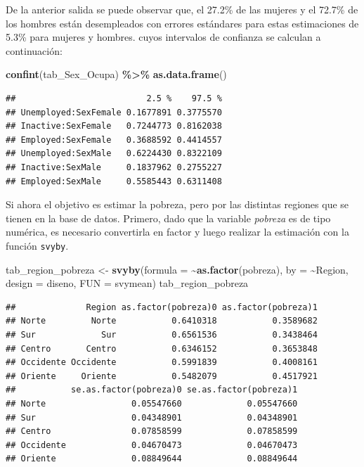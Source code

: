 \documentclass[
  12pt,
]{book}
\newenvironment{Shaded}{\begin{snugshade}}{\end{snugshade}}
\newcommand{\AttributeTok}[1]{\textcolor[rgb]{0.13,0.29,0.53}{#1}}
\newcommand{\FunctionTok}[1]{\textcolor[rgb]{0.13,0.29,0.53}{\textbf{#1}}}
\newcommand{\NormalTok}[1]{#1}
\newcommand{\OtherTok}[1]{\textcolor[rgb]{0.56,0.35,0.01}{#1}}
\newcommand{\SpecialCharTok}[1]{\textcolor[rgb]{0.81,0.36,0.00}{\textbf{#1}}}
\begin{document}
De la anterior salida se puede observar que, el 27.2\% de las mujeres y el 72.7\% de los hombres están desempleados con errores estándares para estas estimaciones de 5.3\% para mujeres y hombres. cuyos intervalos de confianza se calculan a continuación:

\begin{Shaded}
\begin{Highlighting}[]
\FunctionTok{confint}\NormalTok{(tab\_Sex\_Ocupa) }\SpecialCharTok{\%\textgreater{}\%} \FunctionTok{as.data.frame}\NormalTok{()}
\end{Highlighting}
\end{Shaded}

\begin{verbatim}
##                          2.5 %    97.5 %
## Unemployed:SexFemale 0.1677891 0.3775570
## Inactive:SexFemale   0.7244773 0.8162038
## Employed:SexFemale   0.3688592 0.4414557
## Unemployed:SexMale   0.6224430 0.8322109
## Inactive:SexMale     0.1837962 0.2755227
## Employed:SexMale     0.5585443 0.6311408
\end{verbatim}

Si ahora el objetivo es estimar la pobreza, pero por las distintas regiones que se tienen en la base de datos. Primero, dado que la variable \emph{pobreza} es de tipo numérica, es necesario convertirla en factor y luego realizar la estimación con la función \texttt{svyby}.

\begin{Shaded}
\begin{Highlighting}[]
\NormalTok{tab\_region\_pobreza }\OtherTok{\textless{}{-}} \FunctionTok{svyby}\NormalTok{(}\AttributeTok{formula =} \SpecialCharTok{\textasciitilde{}}\FunctionTok{as.factor}\NormalTok{(pobreza),  }\AttributeTok{by =} \SpecialCharTok{\textasciitilde{}}\NormalTok{Region, }
                            \AttributeTok{design =}\NormalTok{  diseno, }\AttributeTok{FUN =}\NormalTok{ svymean)}
\NormalTok{tab\_region\_pobreza}
\end{Highlighting}
\end{Shaded}

\begin{verbatim}
##              Region as.factor(pobreza)0 as.factor(pobreza)1
## Norte         Norte           0.6410318           0.3589682
## Sur             Sur           0.6561536           0.3438464
## Centro       Centro           0.6346152           0.3653848
## Occidente Occidente           0.5991839           0.4008161
## Oriente     Oriente           0.5482079           0.4517921
##           se.as.factor(pobreza)0 se.as.factor(pobreza)1
## Norte                 0.05547660             0.05547660
## Sur                   0.04348901             0.04348901
## Centro                0.07858599             0.07858599
## Occidente             0.04670473             0.04670473
## Oriente               0.08849644             0.08849644
\end{verbatim}
\end{document}
